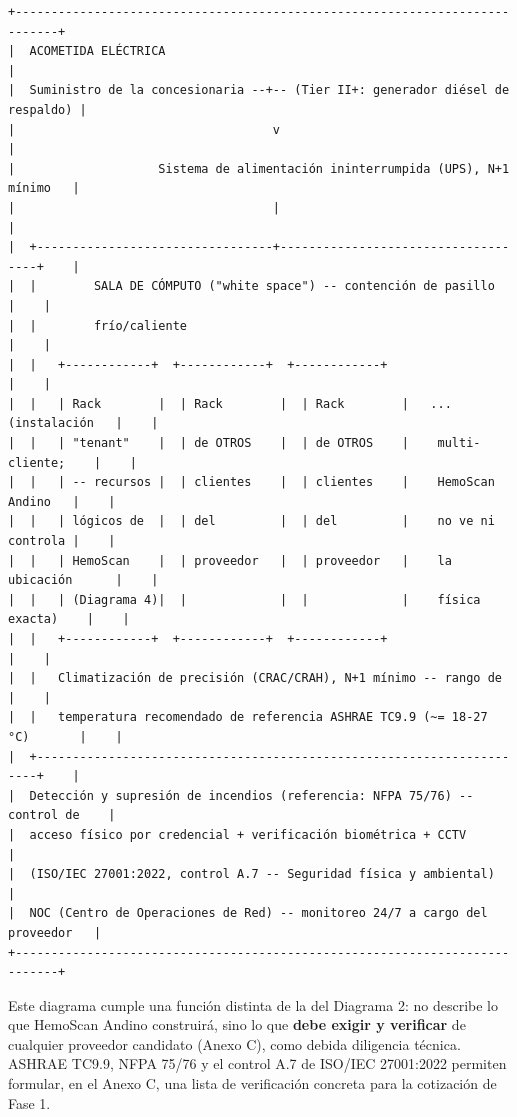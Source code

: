 \documentclass[11pt,a4paper]{article}
\begin{document}
\begin{samepage}\begin{verbatim}
+----------------------------------------------------------------------------+
|  ACOMETIDA ELÉCTRICA                                                          |
|  Suministro de la concesionaria --+-- (Tier II+: generador diésel de respaldo) |
|                                    v                                          |
|                    Sistema de alimentación ininterrumpida (UPS), N+1 mínimo   |
|                                    |                                          |
|  +---------------------------------+------------------------------------+    |
|  |        SALA DE CÓMPUTO ("white space") -- contención de pasillo         |    |
|  |        frío/caliente                                                    |    |
|  |   +------------+  +------------+  +------------+                       |    |
|  |   | Rack        |  | Rack        |  | Rack        |   ... (instalación   |    |
|  |   | "tenant"    |  | de OTROS    |  | de OTROS    |    multi-cliente;    |    |
|  |   | -- recursos |  | clientes    |  | clientes    |    HemoScan Andino   |    |
|  |   | lógicos de  |  | del         |  | del         |    no ve ni controla |    |
|  |   | HemoScan    |  | proveedor   |  | proveedor   |    la ubicación      |    |
|  |   | (Diagrama 4)|  |             |  |             |    física exacta)    |    |
|  |   +------------+  +------------+  +------------+                       |    |
|  |   Climatización de precisión (CRAC/CRAH), N+1 mínimo -- rango de        |    |
|  |   temperatura recomendado de referencia ASHRAE TC9.9 (~= 18-27 °C)       |    |
|  +----------------------------------------------------------------------+    |
|  Detección y supresión de incendios (referencia: NFPA 75/76) -- control de    |
|  acceso físico por credencial + verificación biométrica + CCTV               |
|  (ISO/IEC 27001:2022, control A.7 -- Seguridad física y ambiental)           |
|  NOC (Centro de Operaciones de Red) -- monitoreo 24/7 a cargo del proveedor   |
+----------------------------------------------------------------------------+
\end{verbatim}\end{samepage}

Este diagrama cumple una función distinta de la del Diagrama 2: no describe lo que HemoScan Andino construirá, sino lo que \textbf{debe exigir y verificar} de cualquier proveedor candidato (Anexo C), como debida diligencia técnica. ASHRAE TC9.9, NFPA 75/76 y el control A.7 de ISO/IEC 27001:2022 permiten formular, en el Anexo C, una lista de verificación concreta para la cotización de Fase 1.
\end{document}
